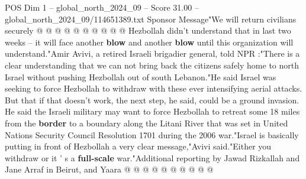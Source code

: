 \begin{textsample}{POS Dim 1 – global\_north\_2024\_09 – Score 31.00 – global\_north\_2024\_09/114651389.txt}
Sponsor Message"We will return civilians securely @ @ @ @ @ @ @ @ @ @ Hezbollah didn't understand that in last two weeks -- it will face another \textbf{blow} and another \textbf{blow} until this organization will understand."Amir Avivi, a retired Israeli brigadier general, told NPR :"There is a clear understanding that we can not bring back the citizens safely home to north Israel without pushing Hezbollah out of south Lebanon."He said Israel was seeking to force Hezbollah to withdraw with these ever intensifying aerial attacks.
But that if that doesn't work, the next step, he said, could be a ground invasion.
He said the Israeli military may want to force Hezbollah to retreat some 18 miles from the \textbf{border} to a boundary along the Litani River that was set in United Nations Security Council Resolution 1701 during the 2006 war."Israel is basically putting in front of Hezbollah a very clear message,"Avivi said."Either you withdraw or it ' s a \textbf{full-scale} war."Additional reporting by Jawad Rizkallah and Jane Arraf in Beirut, and Yaara @ @ @ @ @ @ @ @ @ @

\end{textsample}
